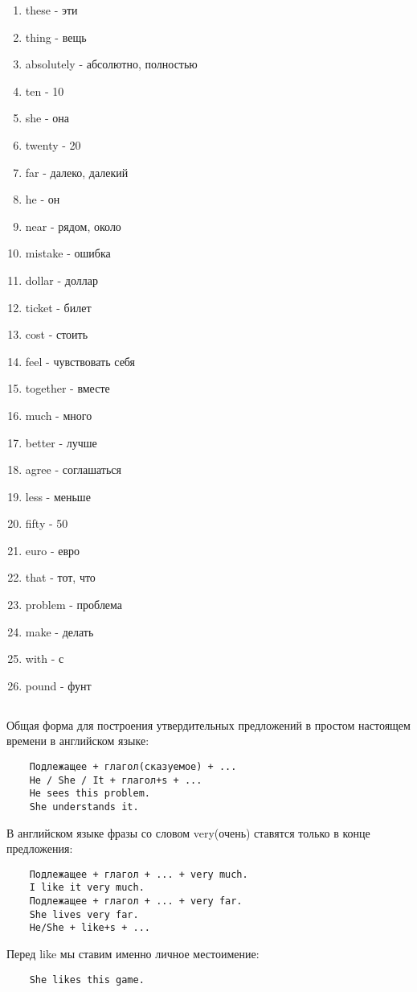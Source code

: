\begin{multicols}{2}
\begin{enumerate}
        \item these - эти
        \item thing - вещь
        \item absolutely - абсолютно, полностью
        \item ten - 10
        \item she - она
        \item twenty - 20
        \item far - далеко, далекий
        \item he - он
        \item near - рядом, около
        \item mistake - ошибка
        \item dollar - доллар
        \item ticket - билет
        \item cost - стоить
        \item feel - чувствовать себя
        \item together - вместе
        \item much - много
        \item better - лучше
        \item agree - соглашаться
        \item less - меньше
        \item fifty - 50
        \item euro - евро
        \item that - тот, что
        \item problem - проблема
        \item make - делать
        \item with - с
        \item pound - фунт
    \end{enumerate}
\end{multicols}

\subsection*{}
Общая форма для построения утвердительных предложений в простом настоящем времени в английском языке:
\begin{verbatim}
    Подлежащее + глагол(сказуемое) + ...
    He / She / It + глагол+s + ...
    He sees this problem.
    She understands it.
\end{verbatim}

В английском языке фразы со словом very(очень) ставятся только в конце предложения:
\begin{verbatim}
    Подлежащее + глагол + ... + very much.
    I like it very much.
    Подлежащее + глагол + ... + very far.
    She lives very far.
    He/She + like+s + ...
\end{verbatim}
Перед like мы ставим именно личное местоимение:
\begin{verbatim}
    She likes this game.
\end{verbatim}

